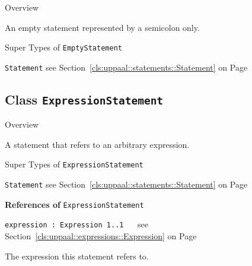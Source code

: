 	\begin{longdescription}
		\item[Overview] 		
				

	

		An empty statement represented by a semicolon only.		
		\item[Super Types of \texttt{EmptyStatement}] ~
			\begin{longdescription}
				\item[\texttt{Statement}] see Section~\ref{cls:uppaal::statements::Statement} on Page~\pageref{cls:uppaal::statements::Statement}						\end{longdescription}
		
	
	
	\end{longdescription}
	

\subsection{Class \bfseries \texttt{ExpressionStatement}\normalfont}
\label{cls:uppaal::statements::ExpressionStatement} 
	
	\begin{longdescription}
		\item[Overview] 		
				

	

		A statement that refers to an arbitrary expression.		
		\item[Super Types of \texttt{ExpressionStatement}] ~
			\begin{longdescription}
				\item[\texttt{Statement}] see Section~\ref{cls:uppaal::statements::Statement} on Page~\pageref{cls:uppaal::statements::Statement}						\end{longdescription}
		
	
			\item[\textbf{References of} \texttt{ExpressionStatement}] ~
			\begin{longdescription}
	\item[\texttt{expression : Expression 	\symbol{"5B}1..1\symbol{"5D}
}] ~
	see Section~\ref{cls:uppaal::expressions::Expression} on Page~\pageref{cls:uppaal::expressions::Expression}
	
	\nopagebreak
		
				

	

		The expression this statement refers to.		
			\end{longdescription}
	
	\end{longdescription}
	

